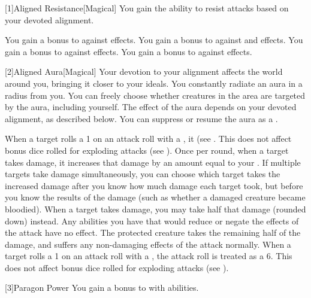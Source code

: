         [1]{Aligned Resistance}[Magical]
        You gain the ability to resist attacks based on your devoted alignment.

         You gain a  bonus to  against  effects.
         You gain a  bonus to  against  and  effects.
         You gain a  bonus to  against  effects.
         You gain a  bonus to  against  effects.

        [2]{Aligned Aura}[Magical]
        Your devotion to your alignment affects the world around you, bringing it closer to your ideals.
        You constantly radiate an aura in a \areamed radius  from you.
        You can freely choose whether creatures in the area are targeted by the aura, including yourself.
        The effect of the aura depends on your devoted alignment, as described below.
        You can suppress or resume the aura as a .

         When a target rolls a 1 on an attack roll with a , it  (see .
        This does not affect bonus dice rolled for exploding attacks (see ).
         Once per round, when a target takes damage, it increases that damage by an amount equal to your .
        If multiple targets take damage simultaneously, you can choose which target takes the increased damage after you know how much damage each target took,
        but before you know the results of the damage (such as whether a damaged creature became bloodied).
         When a target takes damage, you may take half that damage (rounded down) instead.
        Any abilities you have that would reduce or negate the effects of the attack have no effect.
        The protected creature takes the remaining half of the damage, and suffers any non-damaging effects of the attack normally.
         When a target rolls a 1 on an attack roll with a , the attack roll is treated as a 6.
        This does not affect bonus dice rolled for exploding attacks (see ).

        [3]{Paragon Power}
        You gain a  bonus to  with  abilities.

